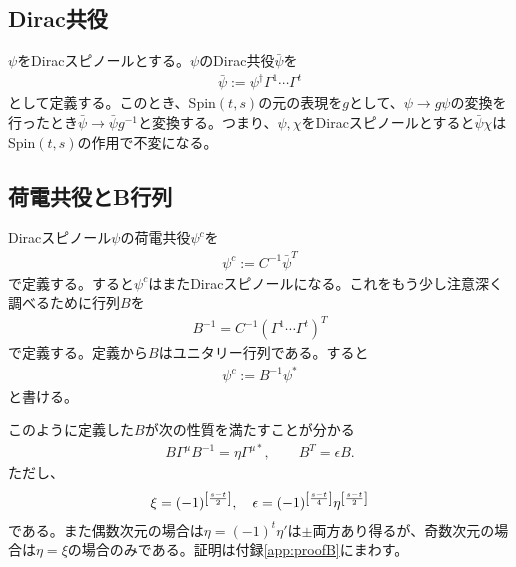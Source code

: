 \documentclass[12pt,a4paper]{jlreq}
\begin{document}
\subsection{Dirac共役}
$\psi$をDiracスピノールとする。$\psi$のDirac共役$\bar{\psi}$を
\begin{align*}
  \bar{\psi}:=\psi^{\dag}\Gamma^{1}\cdots \Gamma^{t}
\end{align*}
として定義する。このとき、Spin$(t,s)$の元の表現を$g$として、$\psi\to g\psi$の変換を行ったとき$\bar{\psi}\to \bar{\psi}g^{-1}$と変換する。つまり、$\psi,\chi$をDiracスピノールとすると$\bar{\psi}\chi$はSpin$(t,s)$の作用で不変になる。

\subsection{荷電共役とB行列}
Diracスピノール$\psi$の荷電共役$\psi^c$を
\begin{align}
  \psi^{c}:=C^{-1}\bar{\psi}^T
\end{align}
で定義する。すると$\psi^{c}$はまたDiracスピノールになる。これをもう少し注意深く調べるために行列$B$を
\begin{align}
  B^{-1}=C^{-1} (\Gamma^{1}\cdots \Gamma^{t})^T
  \label{defB}
\end{align}
で定義する。定義から$B$はユニタリー行列である。すると
\begin{align*}
  \psi^{c}:=B^{-1}\psi^{*}
\end{align*}
と書ける。

このように定義した$B$が次の性質を満たすことが分かる
\begin{align}
  B\Gamma^{\mu}B^{-1}=\eta \Gamma^{\mu*},\qquad B^T=\epsilon B.\label{B-properties1}
\end{align}
ただし、
\begin{align}
  \xi=(-1)^{\qty[\frac{s-t}{2}]},\quad
  \epsilon=(-1)^{\qty[\frac{s-t}{4}]}\eta^{\qty[\frac{s-t}{2}]}
  \label{B-signs}
\end{align}
である。また偶数次元の場合は$\eta=(-1)^{t}\eta'$は$\pm$両方あり得るが、奇数次元の場合は$\eta=\xi$の場合のみである。証明は付録\ref{app:proofB}にまわす。
\end{document}
